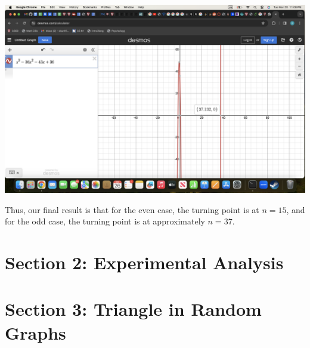 \documentclass{article}
\begin{document}
\includegraphics[width=\linewidth]{StrassenPlot.png}

Thus, our final result is that for the even case, the turning point is at $n=15$, and for the odd case, the turning point is at approximately $n=37$.

\section{Section 2: Experimental Analysis}


\section{Section 3: Triangle in Random Graphs}
\end{document}
